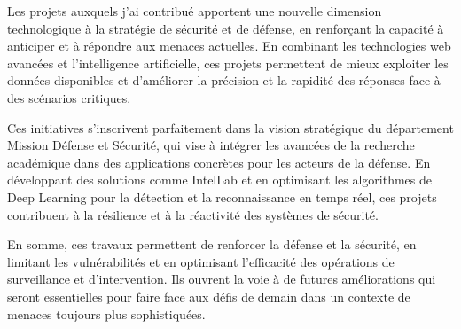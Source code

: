 %
\sloppy

Les projets auxquels j'ai contribué apportent une nouvelle dimension technologique à la stratégie de sécurité et de défense, en renforçant la capacité à anticiper et à répondre aux menaces actuelles. En combinant les technologies web avancées et l'intelligence artificielle, ces projets permettent de mieux exploiter les données disponibles et d'améliorer la précision et la rapidité des réponses face à des scénarios critiques.

Ces initiatives s'inscrivent parfaitement dans la vision stratégique du département Mission Défense et Sécurité, qui vise à intégrer les avancées de la recherche académique dans des applications concrètes pour les acteurs de la défense. En développant des solutions comme IntelLab et en optimisant les algorithmes de Deep Learning pour la détection et la reconnaissance en temps réel, ces projets contribuent à la résilience et à la réactivité des systèmes de sécurité.

En somme, ces travaux permettent de renforcer la défense et la sécurité, en limitant les vulnérabilités et en optimisant l'efficacité des opérations de surveillance et d'intervention. Ils ouvrent la voie à de futures améliorations qui seront essentielles pour faire face aux défis de demain dans un contexte de menaces toujours plus sophistiquées.
